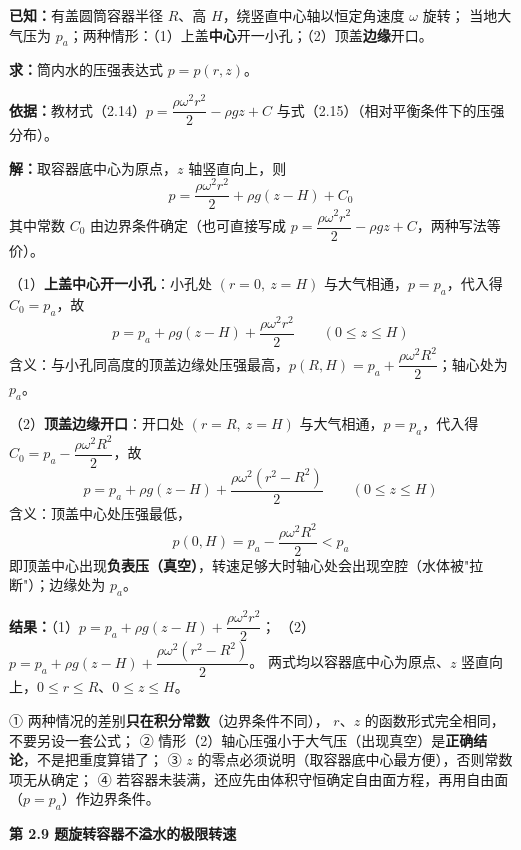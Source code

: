 \begin{jie}
\textbf{已知：}有盖圆筒容器半径 $R$、高 $H$，绕竖直中心轴以恒定角速度 $\omega$ 旋转；
当地大气压为 $p_a$；两种情形：（1）上盖\textbf{中心}开一小孔；（2）顶盖\textbf{边缘}开口。

\textbf{求：}筒内水的压强表达式 $p=p(r,z)$。

\textbf{依据：}教材式（2.14）$p=\dfrac{\rho\omega^2r^2}{2}-\rho gz+C$ 与式（2.15）（相对平衡条件下的压强分布）。

\textbf{解：}取容器底中心为原点，$z$ 轴竖直向上，则
\[ p=\frac{\rho\omega^2r^2}{2}+\rho g\left(z-H\right)+C_0 \]
其中常数 $C_0$ 由边界条件确定（也可直接写成 $p=\dfrac{\rho\omega^2r^2}{2}-\rho gz+C$，两种写法等价）。

（1）\textbf{上盖中心开一小孔}：小孔处 $(r=0,\ z=H)$ 与大气相通，$p=p_a$，代入得 $C_0=p_a$，故
\[ p=p_a+\rho g\left(z-H\right)+\frac{\rho\omega^2r^2}{2}\qquad(0\le z\le H) \]
含义：与小孔同高度的顶盖边缘处压强最高，$p\left(R,H\right)=p_a+\dfrac{\rho\omega^2R^2}{2}$；轴心处为 $p_a$。

（2）\textbf{顶盖边缘开口}：开口处 $(r=R,\ z=H)$ 与大气相通，$p=p_a$，代入得
$C_0=p_a-\dfrac{\rho\omega^2R^2}{2}$，故
\[ p=p_a+\rho g\left(z-H\right)+\frac{\rho\omega^2\left(r^2-R^2\right)}{2}\qquad(0\le z\le H) \]
含义：顶盖中心处压强最低，
\[ p\left(0,H\right)=p_a-\frac{\rho\omega^2R^2}{2}<p_a \]
即顶盖中心出现\textbf{负表压（真空）}，转速足够大时轴心处会出现空腔（水体被"拉断"）；边缘处为 $p_a$。

\textbf{结果：}（1）$p=p_a+\rho g\left(z-H\right)+\dfrac{\rho\omega^2r^2}{2}$；
（2）$p=p_a+\rho g\left(z-H\right)+\dfrac{\rho\omega^2\left(r^2-R^2\right)}{2}$。
两式均以容器底中心为原点、$z$ 竖直向上，$0\le r\le R$、$0\le z\le H$。
\end{jie}

\begin{yicuo}
① 两种情况的差别\textbf{只在积分常数}（边界条件不同），
$r$、$z$ 的函数形式完全相同，不要另设一套公式；
② 情形（2）轴心压强小于大气压（出现真空）是\textbf{正确结论}，不是把重度算错了；
③ $z$ 的零点必须说明（取容器底中心最方便），否则常数项无从确定；
④ 若容器未装满，还应先由体积守恒确定自由面方程，再用自由面（$p=p_a$）作边界条件。
\end{yicuo}

\noindent\textbf{第 2.9 题\quad 旋转容器不溢水的极限转速}

